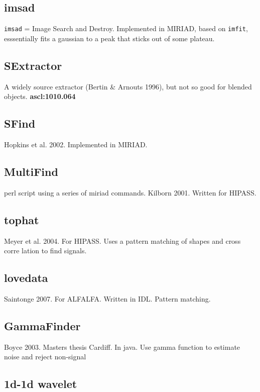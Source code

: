 \documentclass[preprint]{aastex} %
\begin{document}
\subsection{imsad}

{\tt imsad} = Image Search and Destroy. 
Implemented in MIRIAD, based on {\tt imfit}, esssentially fits a gaussian
to a peak that sticks out of some plateau.

\subsection{SExtractor}

A widely source extractor (Bertin \& Arnouts 1996), but not so good for blended 
objects.
{\bf ascl:1010.064}

\subsection{SFind}

Hopkins et al. 2002.   Implemented in MIRIAD.

\subsection{MultiFind}
perl script using a series of miriad commands. Kilborn 2001. Written for HIPASS.

\subsection{tophat}

Meyer et al. 2004. For HIPASS. Uses a pattern matching of shapes and cross corre
lation
to find signals.

\subsection{lovedata}

Saintonge 2007. For ALFALFA. Written in IDL. Pattern matching.


\subsection{GammaFinder}

Boyce 2003. Masters thesis Cardiff.  In java. Use gamma function to estimate
noise and reject non-signal

\subsection{1d-1d wavelet}
\end{document}
